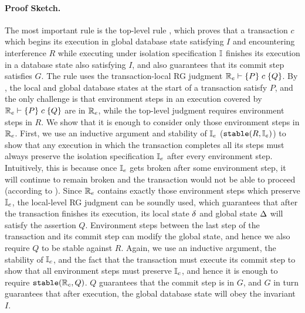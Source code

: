 \paragraph{{\sc Proof Sketch.}}  The most important rule is the top-level
rule , which proves that a transaction $c$ which
begins its execution in global database state satisfying $I$ and
encountering interference $R$ while executing under isolation
specification $\mathbb{I}$ finishes its execution in a database state also
satisfying $I$, and also guarantees that its commit step satisfies
$G$. The rule uses the transaction-local RG judgment $\mathbb{R}_e \vdash
\{P\}\;c\;\{Q\}$. By , the local and global
database states at the start of a transaction satisfy $P$, and the
only challenge is that environment steps in an execution covered by
$\mathbb{R}_e \vdash \{P\}\;c\;\{Q\}$ are in $\mathbb{R}_e$, while the top-level
judgment requires environment steps in $R$. We show that it is enough
to consider only those environment steps in $\mathbb{R}_e$. First, we use an
inductive argument and stability of $\mathbb{I}_e$ ($\mathtt{stable}(R, \mathbb{I}_e)$) to
show that any execution in which the transaction completes all its
steps must always preserve the isolation specification $\mathbb{I}_e$ after
every environment step. Intuitively, this is because once $\mathbb{I}_e$ gets
broken after some environment step, it will continue to remain broken
and the transaction would not be able to proceed (according to
). Since $\mathbb{R}_e$ contains exactly those environment
steps which preserve $\mathbb{I}_e$, the local-level RG judgment can be
soundly used, which guarantees that after the transaction finishes its
execution, its local state $\delta$ and global state $\Delta$ will satisfy
the assertion $Q$. Environment steps between the last step of the
transaction and its commit step can modify the global state, and hence
we also require $Q$ to be stable against $R$. Again, we use an
inductive argument, the stability of $\mathbb{I}_c$, and the fact that the
transaction must execute its commit step to show that all environment
steps must preserve $\mathbb{I}_c$, and hence it is enough to require
$\mathtt{stable}(\mathbb{R}_c, Q)$. $Q$ guarantees that the commit step is in $G$, and
$G$ in turn guarantees that after execution, the global database state
will obey the invariant $I$.

